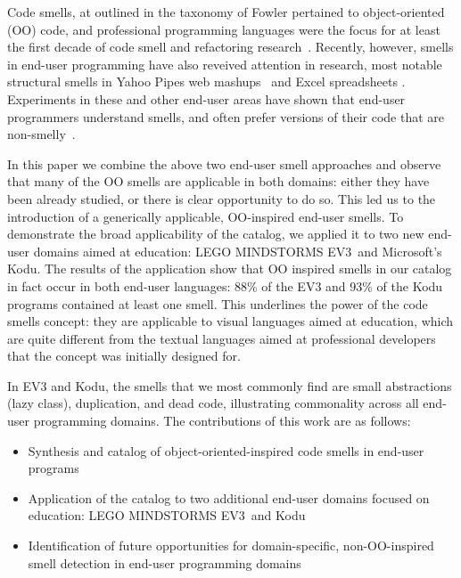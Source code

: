 \documentclass{sig-alternate}
\newcommand{\ms}{LEGO MINDSTORMS EV3}
\begin{document}
Code smells, at outlined in the taxonomy of Fowler pertained to object-oriented (OO) code, and professional programming languages were the focus for at least the first decade of code smell  and refactoring research~\cite{Mens:2004:SSR:972215.972286}. Recently, however, smells in end-user programming have also reveived attention in research, most notable structural smells in Yahoo Pipes web mashups~\cite{Stolee2011} and Excel spreadsheets \cite{Hermans2012inter}. Experiments in these and other end-user areas have shown that end-user programmers understand smells, and often prefer versions of their code that are non-smelly~\cite{Hermans2012intra, StoleeTSE2013, chambers2013smell}.


In this paper we combine the above two end-user smell approaches and observe that many of the OO smells are applicable in both domains: either they have been already studied, or there is clear opportunity to do so. This led us to the introduction of a generically applicable, OO-inspired end-user smells. To demonstrate the broad applicability of the catalog, we applied it to two new end-user domains aimed at education: \ms~and Microsoft's Kodu. The results of the application show that OO inspired smells in our catalog in fact occur in both end-user languages: 88\% of the EV3 and 93\% of the Kodu programs contained at least one smell. This underlines the power of the code smells concept: they are applicable to visual languages aimed at education, which are quite different from the textual languages aimed at professional developers that the concept was initially designed for. 

In EV3 and Kodu, the smells that we most commonly find are small abstractions (lazy class), duplication, and dead code, illustrating commonality across all end-user programming domains. The contributions of this work are as follows:

\begin{itemize}
	\item Synthesis and catalog of object-oriented-inspired code smells in end-user programs
	\item Application of the catalog to two additional end-user domains focused on education: \ms~and Kodu
	\item Identification of future opportunities for domain-specific, non-OO-inspired smell detection in end-user programming domains
\end{itemize}
\end{document}
